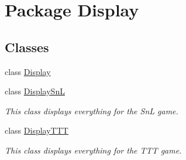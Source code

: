 \hypertarget{namespace_display}{}\section{Package Display}
\label{namespace_display}
\subsection*{Classes}
\begin{DoxyCompactItemize}
\item 
class \hyperlink{class_display_1_1_display}{Display}
\item 
class \hyperlink{class_display_1_1_display_sn_l}{Display\+Sn\+L}
\begin{DoxyCompactList}\small\item\em This class displays everything for the Sn\+L game. \end{DoxyCompactList}\item 
class \hyperlink{class_display_1_1_display_t_t_t}{Display\+T\+T\+T}
\begin{DoxyCompactList}\small\item\em This class displays everything for the T\+T\+T game. \end{DoxyCompactList}\end{DoxyCompactItemize}
